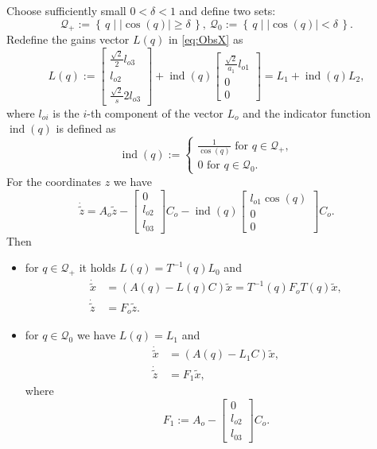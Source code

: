 Choose sufficiently small $0<\delta<1$ and define two sets:
\[
	\mathcal{Q}_+ := \left\{\,q \mid |\cos(q)|\ge \delta \,\right\}, \ \mathcal{Q}_0 := \left\{\,q \mid |\cos(q)|< \delta \,\right\}.
\]
Redefine the gains vector $L(q)$ in \eqref{eq:ObsX} as 
\begin{equation} \label{eq:newL}
	L(q) := \begin{bmatrix} \frac{\sqrt{2}}{2}l_{o3} \\ l_{o2} \\  \frac{\sqrt{2}}s{2}l_{o3}\end{bmatrix} + 
			\operatorname{ind}(q)\begin{bmatrix} \frac{\sqrt{2}}{a_1}l_{o1} \\0 \\0 \end{bmatrix} 
			= L_1 + \operatorname{ind}(q)L_2,
\end{equation}
where $l_{oi}$ is the $i$-th component of the vector $L_o$ and the indicator function $\operatorname{ind}(q)$ is defined as
\[
	\operatorname{ind}(q) := \begin{cases}
	\frac{1}{\cos(q)} \text{ for } q\in\mathcal{Q}_+, \\
	0 \text{ for } q\in\mathcal{Q}_0.
	\end{cases}
\]
For the coordinates $z$ we have
\[
	\dot{\tilde{z}} = A_o\tilde{z} -\begin{bmatrix} 0 \\ l_{o2} \\ l_{03} \end{bmatrix}C_o - \operatorname{ind}(q)\begin{bmatrix} l_{o1}\cos(q) \\0 \\ 0\end{bmatrix}C_o.
\]
Then 
\begin{itemize}
	\item for $q\in\mathcal{Q}_+$ it holds $L(q) = T^{-1}(q)L_0$ and 
	\[
		\begin{aligned}
			\dot{\tilde{x}} &= \left(A(q)-L(q)C\right) \tilde{x} = T^{-1}(q) F_o T(q)\tilde{x}, \\
			\dot{\tilde{z}} &= F_o \tilde{z}.
		\end{aligned}
	\]
	\item for $q\in\mathcal{Q}_0$ we have $L(q)=L_1$ and
	\[
		\begin{aligned}
			\dot{\tilde{x}} &= \left(A(q)-L_1C\right) \tilde{x}, \\
			\dot{\tilde{z}} &= F_1 \tilde{x},
		\end{aligned}
	\]
	where 
	\[
		F_1 := A_o - \begin{bmatrix} 0 \\ l_{o2} \\ l_{03} \end{bmatrix}C_o.
	\]
\end{itemize}




